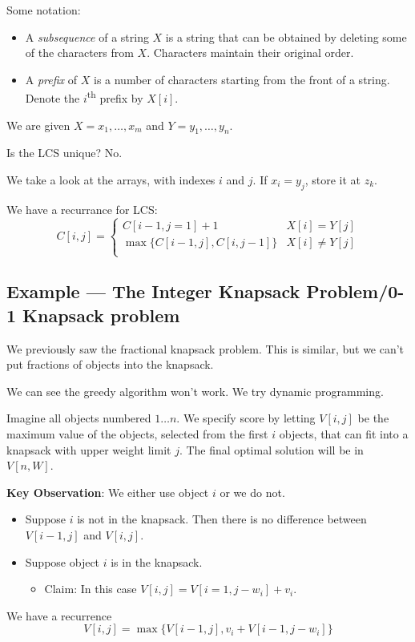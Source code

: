 \documentclass[12pt]{article}
\begin{document}
Some notation:

\begin{itemize}
	\item A \emph{subsequence} of a string $X$ is a string that can be obtained
		by deleting some of the characters from $X$. Characters maintain their
		original order.
	\item A \emph{prefix} of $X$ is a number of characters starting from the
		front of a string. Denote the $i$\textsuperscript{th} prefix by $X[i]$.
\end{itemize}

We are given $X = x_1,\dots,x_m$ and $Y = y_1,\dots,y_n$.

Is the LCS unique? No.

We take a look at the arrays, with indexes $i$ and $j$. If $x_{i} = y_{j}$,
store it at $z_k$.

We have a recurrance for LCS:
\begin{equation}
	C[i,j] = \begin{cases}
		C[i-1,j=1]+1 & X[i] = Y[j]\\
		\max \{C[i-1,j],C[i,j-1]\} & X[i]\neq Y[j]\\
	\end{cases}
\end{equation}

\subsection{Example --- The Integer Knapsack Problem\slash 0-1 Knapsack problem}

We previously saw the fractional knapsack problem. This is similar, but we can't
put fractions of objects into the knapsack.

We can see the greedy algorithm won't work.  We try dynamic programming.

Imagine all objects numbered $1\dots n$. We specify score by letting $V[i,j]$ be
the maximum value of the objects, selected from the first $i$ objects, that can
fit into a knapsack with upper weight limit $j$. The final optimal solution will
be in $V[n,W]$.

\textbf{Key Observation}: We either use object $i$ or we do not.
\begin{itemize}
	\item Suppose $i$ is not in the knapsack. Then there is no difference
		between $V[i-1,j]$ and $V[i,j]$.
	\item Suppose object $i$ is in the knapsack.
		\begin{itemize}
			\item Claim: In this case $V[i,j] = V[i=1,j-w_i] + v_i$.
		\end{itemize}
\end{itemize}

We have a recurrence
\begin{equation}
	V[i,j] = \max \{V[i-1,j], v_i + V[i-1,j-w_i]\}
\end{equation}
\end{document}
